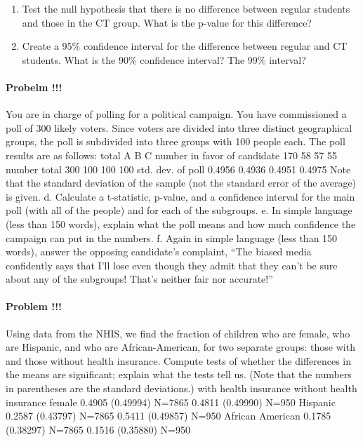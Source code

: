 \documentclass[]{article}
\providecommand{\tightlist}{%
  \setlength{\itemsep}{0pt}\setlength{\parskip}{0pt}}
\let\oldparagraph\paragraph
\renewcommand{\paragraph}[1]{\oldparagraph{#1}\mbox{}}
\begin{document}
\begin{enumerate}
\def\labelenumi{\alph{enumi}.}
\setcounter{enumi}{3}
\tightlist
\item
  Test the null hypothesis that there is no difference between regular
  students and those in the CT group. What is the p-value for this
  difference?
\item
  Create a 95\% confidence interval for the difference between regular
  and CT students. What is the 90\% confidence interval? The 99\%
  interval?
\end{enumerate}

\paragraph{Probelm !!!}\label{probelm}

You are in charge of polling for a political campaign. You have
commissioned a poll of 300 likely voters. Since voters are divided into
three distinct geographical groups, the poll is subdivided into three
groups with 100 people each. The poll results are as follows: total A B
C number in favor of candidate 170 58 57 55 number total 300 100 100 100
std. dev. of poll 0.4956 0.4936 0.4951 0.4975 Note that the standard
deviation of the sample (not the standard error of the average) is
given. d. Calculate a t-statistic, p-value, and a confidence interval
for the main poll (with all of the people) and for each of the
subgroups. e. In simple language (less than 150 words), explain what the
poll means and how much confidence the campaign can put in the numbers.
f. Again in simple language (less than 150 words), answer the opposing
candidate's complaint, ``The biased media confidently says that I'll
lose even though they admit that they can't be sure about any of the
subgroups! That's neither fair nor accurate!''

\paragraph{Problem !!!}\label{problem}

Using data from the NHIS, we find the fraction of children who are
female, who are Hispanic, and who are African-American, for two separate
groups: those with and those without health insurance. Compute tests of
whether the differences in the means are significant; explain what the
tests tell us. (Note that the numbers in parentheses are the standard
deviations.) with health insurance without health insurance female
0.4905 (0.49994) N=7865 0.4811 (0.49990) N=950 Hispanic 0.2587 (0.43797)
N=7865 0.5411 (0.49857) N=950 African American 0.1785 (0.38297) N=7865
0.1516 (0.35880) N=950
\end{document}
